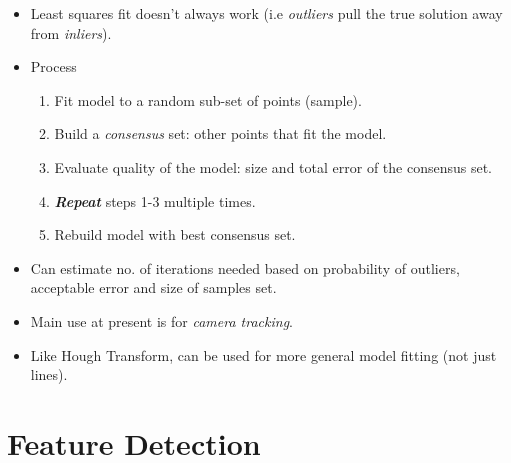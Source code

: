 \documentclass[english, 10pt]{article}
\begin{document}
\begin{itemize}
\item
  Least squares fit doesn't always work (i.e \emph{outliers} pull the
  true solution away from \emph{inliers}).
\item
  Process

  \begin{enumerate}
  \def\labelenumi{\arabic{enumi}.}
  \itemsep1pt\parskip0pt
  \item
    Fit model to a random sub-set of points (sample).
  \item
    Build a \emph{consensus} set: other points that fit the model.
  \item
    Evaluate quality of the model: size and total error of the consensus
    set.
  \item
    \textbf{\emph{Repeat}} steps 1-3 multiple times.
  \item
    Rebuild model with best consensus set.
  \end{enumerate}
\item
  Can estimate no. of iterations needed based on probability of
  outliers, acceptable error and size of samples set.
\item
  Main use at present is for \emph{camera tracking}.
\item
  Like Hough Transform, can be used for more general model fitting (not
  just lines).
\end{itemize}

\section{Feature Detection}
\end{document}
